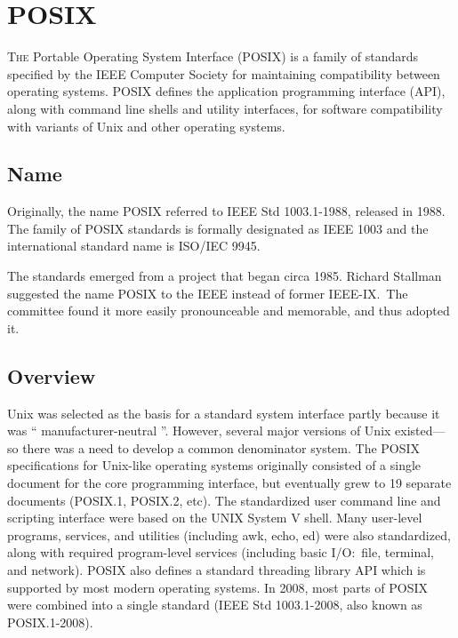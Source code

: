 \sectionend

\section{{POSIX}}
\label{sec:posix}


\lettrine[lines=3, findent=3pt, nindent=0pt]{T}{he} Portable Operating System
Interface (POSIX) is a family of standards specified by the IEEE Computer
Society for maintaining compatibility between operating systems. POSIX defines
the application programming interface (API), along with command line shells and
utility interfaces, for software compatibility with variants of Unix and other
operating systems.





\subsection{Name}
\label{ssec:name}

Originally, the name POSIX referred to IEEE Std 1003.1-1988, released in 1988.
The family of POSIX standards is formally designated as IEEE 1003 and the
international standard name is ISO/IEC 9945.



The standards emerged from a project that began circa 1985. Richard Stallman
suggested the name POSIX to the IEEE instead of former IEEE-IX.\ The committee
found it more easily pronounceable and memorable, and thus adopted it.



\subsectionend

\subsection{Overview}
\label{ssec:overview}

Unix was selected as the basis for a standard system interface partly because it
was `` manufacturer-neutral ''. However, several major versions of Unix existed—so
there was a need to develop a common denominator system. The POSIX
specifications for Unix-like operating systems originally consisted of a single
document for the core programming interface, but eventually grew to 19 separate
documents (POSIX.1, POSIX.2, etc). The standardized user command line and
scripting interface were based on the UNIX System V shell. Many user-level
programs, services, and utilities (including awk, echo, ed) were also
standardized, along with required program-level services (including basic I/O:\
file, terminal, and network). POSIX also defines a standard threading library
API which is supported by most modern operating systems. In 2008, most parts of
POSIX were combined into a single standard (IEEE Std 1003.1-2008, also known as
POSIX.1-2008).



